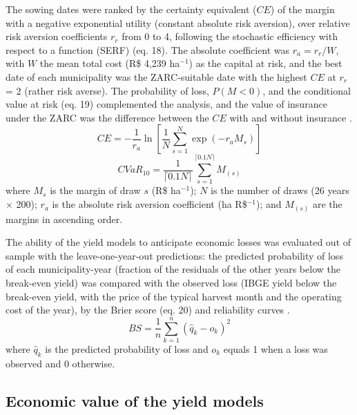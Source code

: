\documentclass[10pt,a4paper]{article}
\begin{document}
The sowing dates were ranked by the certainty equivalent ($CE$) of the margin with a negative exponential
utility (constant absolute risk aversion), over relative risk aversion coefficients $r_r$ from 0 to 4,
following the stochastic efficiency with respect to a function (SERF) (eq. 18). The absolute coefficient
was $r_a = r_r/W$, with $W$ the mean total cost (R\$ 4,239 ha$^{-1}$) as the capital at risk, and the best
date of each municipality was the ZARC-suitable date with the highest $CE$ at $r_r$ = 2 (rather risk
averse). The probability of loss, $P(M < 0)$, and the conditional value at risk (eq. 19) complemented the
analysis, and the value of insurance under the ZARC was the difference between the $CE$ with and without
insurance \citep{hardaker2004, anderson1992, rockafellar2000}.
\begin{equation}
CE = -\frac{1}{r_a}\ln\!\left[\frac{1}{N}\sum_{s=1}^{N} \exp\left(-r_a M_s\right)\right]
\label{eq:ce}
\end{equation}
\begin{equation}
CVaR_{10} = \frac{1}{\lceil 0.1N \rceil}\sum_{s=1}^{\lceil 0.1N \rceil} M_{(s)}
\label{eq:cvar}
\end{equation}
where $M_s$ is the margin of draw $s$ (R\$ ha$^{-1}$); $N$ is the number of draws (26 years $\times$ 200);
$r_a$ is the absolute risk aversion coefficient (ha R\$$^{-1}$); and $M_{(s)}$ are the margins in
ascending order.

The ability of the yield models to anticipate economic losses was evaluated out of sample with the
leave-one-year-out predictions: the predicted probability of loss of each municipality-year (fraction of
the residuals of the other years below the break-even yield) was compared with the observed loss (IBGE
yield below the break-even yield, with the price of the typical harvest month and the operating cost of
the year), by the Brier score (eq. 20) and reliability curves \citep{brier1950}.
\begin{equation}
BS = \frac{1}{n}\sum_{k=1}^{n}\left(\hat{q}_k - o_k\right)^2
\label{eq:brier}
\end{equation}
where $\hat{q}_k$ is the predicted probability of loss and $o_k$ equals 1 when a loss was observed and 0
otherwise.

\subsection{Economic value of the yield models}
\label{subsec:regret}
\end{document}
